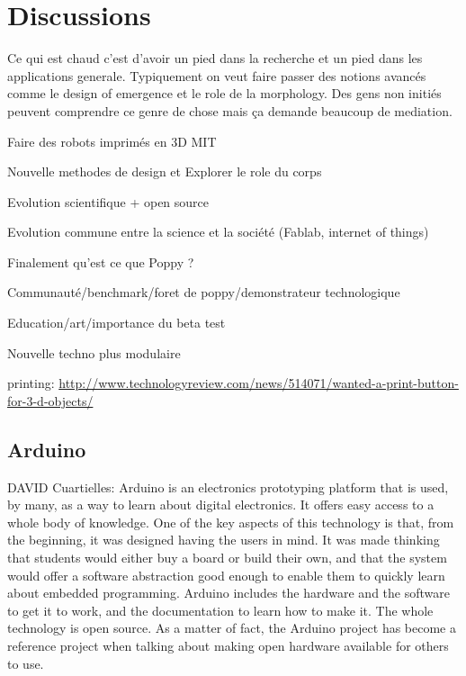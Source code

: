 
\chapter{Discussions} %


Ce qui est chaud c'est d'avoir un pied dans la recherche et un pied dans les applications generale. Typiquement on veut faire passer des notions avancés comme le design of emergence et le role de la morphology. Des gens non initiés peuvent comprendre ce genre de chose mais ça demande beaucoup de mediation.


Faire des robots imprimés en 3D MIT

Nouvelle methodes de design et Explorer le role du corps


Evolution scientifique + open source

Evolution commune entre la science et la société (Fablab, internet of things)

Finalement qu'est ce que Poppy ?

Communauté/benchmark/foret de poppy/demonstrateur technologique

Education/art/importance du beta test

Nouvelle techno plus modulaire










printing:
\url{http://www.technologyreview.com/news/514071/wanted-a-print-button-for-3-d-objects/}



\section{Arduino} %
\label{sec:arduino}


DAVID Cuartielles: Arduino is an electronics prototyping platform that is used, by many, as a way to learn about digital electronics. It offers easy access to a whole body of knowledge. One of the key aspects of this technology is that, from the beginning, it was designed having the users in mind. It was made thinking that students would either buy a board or build their own, and that the system would offer a software abstraction good enough to enable them to quickly learn about embedded programming. Arduino includes the hardware and the software to get it to work, and the documentation to learn how to make it. The whole technology is open source. As a matter of fact, the Arduino project has become a reference project when talking about making open hardware available for others to use.

